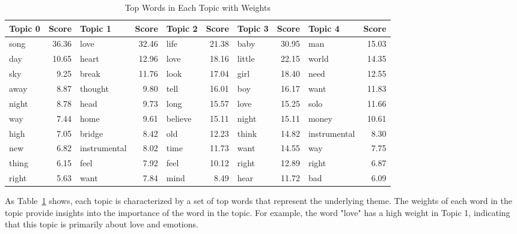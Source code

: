 \documentclass{article}
\begin{document}
\begin{table}[H]
    \centering
    \begin{footnotesize}
        \begin{tabular}{|l|r|l|r|l|r|l|r|l|r|}
        \hline
        \textbf{Topic 0} & \textbf{Score} & \textbf{Topic 1} & \textbf{Score} & \textbf{Topic 2} & \textbf{Score} & \textbf{Topic 3} & \textbf{Score} & \textbf{Topic 4} & \textbf{Score} \\
        \hline
        song         & 36.36 & love         & 32.46 & life         & 21.38 & baby         & 30.95 & man          & 15.03 \\
        day          & 10.65 & heart        & 12.96 & love         & 18.16 & little       & 22.15 & world        & 14.35 \\
        sky          & 9.25  & break        & 11.76 & look         & 17.04 & girl         & 18.40 & need         & 12.55 \\
        away         & 8.87  & thought      & 9.80  & tell         & 16.01 & boy          & 16.17 & want         & 11.83 \\
        night        & 8.78  & head         & 9.73  & long         & 15.57 & love         & 15.25 & solo         & 11.66 \\
        way          & 7.44  & home         & 9.61  & believe      & 15.11 & night        & 15.11 & money        & 10.61 \\
        high         & 7.05  & bridge       & 8.42  & old          & 12.23 & think        & 14.82 & instrumental & 8.30  \\
        new          & 6.82  & instrumental & 8.02  & time         & 11.73 & want         & 14.55 & way          & 7.75  \\
        thing        & 6.15  & feel         & 7.92  & feel         & 10.12 & right        & 12.89 & right        & 6.87  \\
        right        & 5.63  & want         & 7.84  & mind         & 8.49  & hear         & 11.72 & bad          & 6.09  \\
        \hline
        \end{tabular}
        \end{footnotesize}
    \caption{Top Words in Each Topic with Weights}
    \label{table:topwords}
    \end{table}

\noindent As Table~\ref{table:topwords} shows, each topic is characterized by a set of top words that represent the underlying theme. The weights of each word in the topic provide insights into the importance of the word in the topic. For example, the word "love" has a high weight in Topic 1, indicating that this topic is primarily about love and emotions.\\
\end{document}
